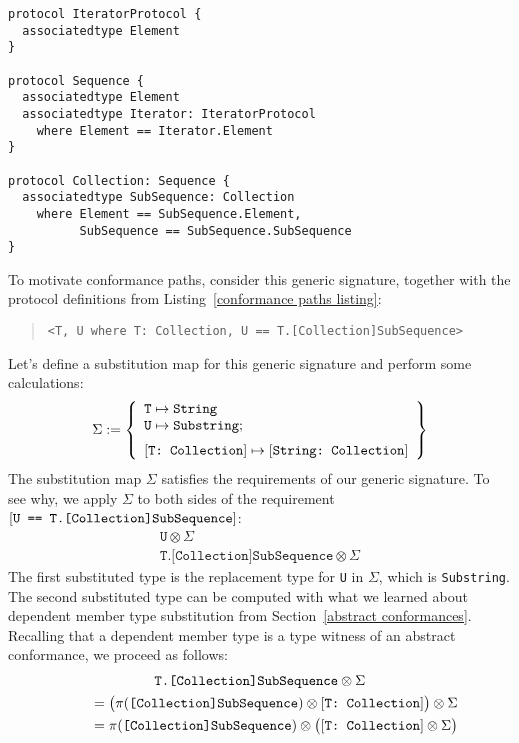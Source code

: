 \documentclass[../generics]{subfiles}
\begin{document}
\begin{listing}\label{conformance paths listing}
\begin{Verbatim}
protocol IteratorProtocol {
  associatedtype Element
}

protocol Sequence {
  associatedtype Element
  associatedtype Iterator: IteratorProtocol
    where Element == Iterator.Element
}

protocol Collection: Sequence {
  associatedtype SubSequence: Collection
    where Element == SubSequence.Element,
          SubSequence == SubSequence.SubSequence
}
\end{Verbatim}
\end{listing}
To motivate conformance paths, consider this generic signature, together with the protocol definitions from Listing~\ref{conformance paths listing}:
\begin{quote}
\begin{verbatim}
<T, U where T: Collection, U == T.[Collection]SubSequence>
\end{verbatim}
\end{quote}
Let's define a substitution map for this generic signature and perform some calculations:
\[
\Sigma := \SubstMapLongC{
\SubstType{T}{String}\\
\SubstType{U}{Substring}
}{
\SubstConf{T}{String}{Collection}
}
\]
The substitution map $\Sigma$ satisfies the requirements of our generic signature. To see why, we apply $\Sigma$ to both sides of the requirement $[\texttt{U == T.[Collection]SubSequence}]$:
\begin{gather*}
\texttt{U} \otimes \Sigma\\
\texttt{T.[Collection]SubSequence} \otimes \Sigma
\end{gather*}
The first substituted type is the replacement type for \texttt{U} in $\Sigma$, which is \texttt{Substring}. The second substituted type can be computed with what we learned about dependent member type substitution from Section~\ref{abstract conformances}. Recalling that a dependent member type is a type witness of an abstract conformance, we proceed as follows:
\begin{gather*}
\texttt{T.[Collection]SubSequence} \otimes \Sigma\\
\qquad {} = \bigl(\pi(\texttt{[Collection]SubSequence}) \otimes [\texttt{T:~Collection}]\bigr) \otimes \Sigma\\
\qquad {} = \pi(\texttt{[Collection]SubSequence}) \otimes \bigl([\texttt{T:~Collection}] \otimes \Sigma\bigr)
\end{gather*}
\end{document}
